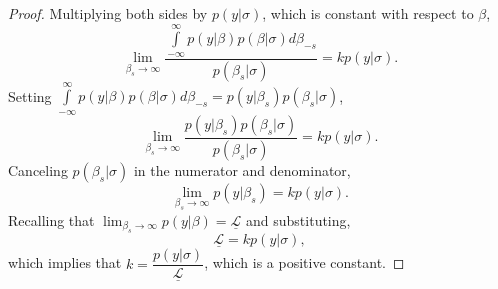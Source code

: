 \documentclass[12pt]{article}
\begin{document}
\begin{appendix}
\begin{proof}
Multiplying both sides by $p(y | \sigma)$, which is constant with respect to $\beta$, 
\begin{equation*}
\lim _{\beta_s \to \infty} \dfrac{\int\limits_{-\infty}^{\infty}p(y | \beta)p(\beta | \sigma)d\beta_{-s}}{p(\beta_s | \sigma)} = kp(y | \sigma).
\end{equation*}
Setting $\int\limits_{-\infty}^{\infty}p(y | \beta)p(\beta | \sigma)d\beta_{-s} = p(y | \beta_s) p(\beta_s | \sigma)$, 
\begin{equation*}
\lim _{\beta_s \to \infty} \dfrac{p(y | \beta_s) p(\beta_s | \sigma)}{ p(\beta_s | \sigma)} = kp(y | \sigma).
\end{equation*}
Canceling $p(\beta_s | \sigma)$ in the numerator and denominator,
\begin{equation*}
\lim _{\beta_s \to \infty} p(y | \beta_s) = kp(y | \sigma).
\end{equation*}
Recalling that $\displaystyle \lim_{\beta_s \to \infty} p(y | \beta) = \underline{\mathscr{L}}$ and substituting,
\begin{equation*}
\underline{\mathscr{L}}= kp(y | \sigma),
\end{equation*}
which implies that $k = \dfrac{p(y | \sigma)}{\underline{\mathscr{L}}}$, which is a positive constant.
\end{proof}

\end{appendix}
\end{document}
